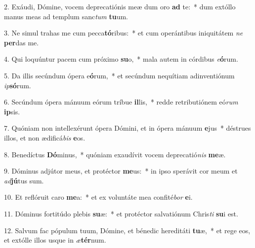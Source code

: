 2. Exáudi, Dómine, vocem deprecatiónis meæ dum oro \textbf{ad} te:~*  dum extóllo manus meas ad templum sanc\textit{tum} \textbf{tu}um.\

3. Ne simul trahas me cum pecca\textbf{tó}ribus:~*  et cum operántibus iniquitátem \textit{ne} \textbf{per}das me.\

4. Qui loquúntur pacem cum próximo \textbf{su}o,~*  mala autem in córdibus \textit{e}\textbf{ó}rum.\

5. Da illis secúndum ópera e\textbf{ó}rum,~*  et secúndum nequítiam adinventiónum \textit{ip}\textbf{só}rum.\

6. Secúndum ópera mánuum eórum tríbue \textbf{il}lis,~*  redde retributiónem eó\textit{rum} \textbf{ip}sis.\

7. Quóniam non intellexérunt ópera Dómini, et in ópera mánuum \textbf{e}jus~*  déstrues illos, et non ædificá\textit{bis} \textbf{e}os.\

8. Benedíctus \textbf{Dó}minus,~*  quóniam exaudívit vocem deprecatió\textit{nis} \textbf{me}æ.\

9. Dóminus adjútor meus, et protéctor \textbf{me}us:~*  in ipso sperávit cor meum et \textit{ad}\textbf{jú}tus sum.\

10. Et reflóruit caro \textbf{me}a:~*  et ex voluntáte mea confité\textit{bor} \textbf{e}i.\

11. Dóminus fortitúdo plebis \textbf{su}æ:~*  et protéctor salvatiónum Chris\textit{ti} \textbf{su}i est.\

12. Salvum fac pópulum tuum, Dómine, et bénedic hereditáti \textbf{tu}æ,~*  et rege eos, et extólle illos usque in \textit{æ}\textbf{tér}num.\

